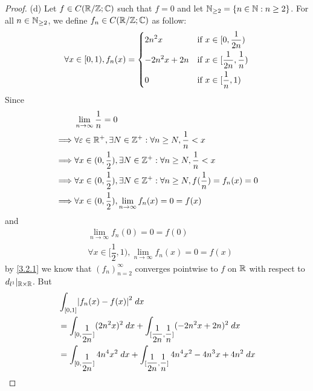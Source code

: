 \begin{proof}{(d)}
  Let \(f \in C(\mathbb{R} / \mathbb{Z} ; \mathbb{C})\) such that \(f = 0\) and let \(\mathbb{N}_{\geq 2} = \{n \in \mathbb{N} : n \geq 2\}\).
  For all \(n \in \mathbb{N}_{\geq 2}\), we define \(f_n \in C(\mathbb{R} / \mathbb{Z} ; \mathbb{C})\) as follow:
  \[
    \forall x \in [0, 1), f_n(x) = \begin{dcases}
      2 n^2 x       & \text{if } x \in [0, \dfrac{1}{2n})            \\
      -2 n^2 x + 2n & \text{if } x \in [\dfrac{1}{2n}, \dfrac{1}{n}) \\
      0             & \text{if } x \in [\dfrac{1}{n}, 1)
    \end{dcases}
  \]
  Since
  \begin{align*}
             & \lim_{n \to \infty} \dfrac{1}{n} = 0                                                                 \\
    \implies & \forall \varepsilon \in \mathbb{R}^+, \exists N \in \mathbb{Z}^+ : \forall n \geq N, \dfrac{1}{n} < x                \\
    \implies & \forall x \in (0, \dfrac{1}{2}), \exists N \in \mathbb{Z}^+ : \forall n \geq N, \dfrac{1}{n} < x             \\
    \implies & \forall x \in (0, \dfrac{1}{2}), \exists N \in \mathbb{Z}^+ : \forall n \geq N, f(\dfrac{1}{n}) = f_n(x) = 0 \\
    \implies & \forall x \in (0, \dfrac{1}{2}), \lim_{n \to \infty} f_n(x) = 0 = f(x)
  \end{align*}
  and
  \begin{align*}
     & \lim_{n \to \infty} f_n(0) = 0 = f(0)                                  \\
     & \forall x \in [\dfrac{1}{2}, 1), \lim_{n \to \infty} f_n(x) = 0 = f(x)
  \end{align*}
  by \cref{3.2.1} we know that \((f_n)_{n = 2}^\infty\) converges pointwise to \(f\) on \(\mathbb{R}\) with respect to \(d_{l^1}|_{\mathbb{R} \times \mathbb{R}}\).
  But
  \begin{align*}
     & \int_{[0, 1]} \abs{f_n(x) - f(x)}^2 \; dx                                                                                                                    \\
     & = \int_{[0, \dfrac{1}{2n}]} (2 n^2 x)^2 \; dx + \int_{[\dfrac{1}{2n}, \dfrac{1}{n}]} (-2n^2 x + 2n)^2 \; dx                                                  \\
     & = \int_{[0, \dfrac{1}{2n}]} 4 n^4 x^2 \; dx + \int_{[\dfrac{1}{2n}, \dfrac{1}{n}]} 4 n^4 x^2 - 4 n^3 x + 4n^2 \; dx                                          \\

\end{align*}
\end{proof}
